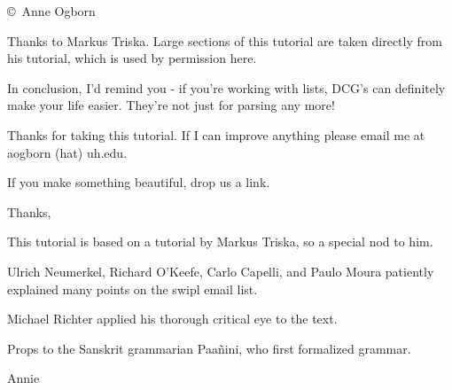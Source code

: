 \secdown
{}
\copyright\ Anne Ogborn 
\bigskip

Thanks to Markus Triska. Large sections of this tutorial are taken directly from
his tutorial, which is used by permission here.













In conclusion, I'd remind you - if you're working with lists, DCG's can definitely make your life easier. They're not just for parsing any more!

Thanks for taking this tutorial. If I can improve anything please email me at aogborn (hat) uh.edu.

If you make something beautiful, drop us a link.

Thanks,

This tutorial is based on a tutorial by Markus Triska, so a special nod to him.

Ulrich Neumerkel, Richard O'Keefe, Carlo Capelli, and Paulo Moura patiently explained many points on the swipl email list.

Michael Richter applied his thorough critical eye to the text.

Props to the Sanskrit grammarian Paañini, who first formalized grammar.


Annie

\secup